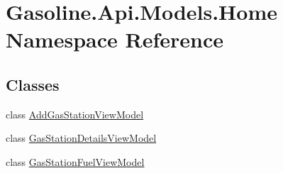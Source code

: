 \hypertarget{namespace_gasoline_1_1_api_1_1_models_1_1_home}{}\section{Gasoline.\+Api.\+Models.\+Home Namespace Reference}
\label{namespace_gasoline_1_1_api_1_1_models_1_1_home}
\subsection*{Classes}
\begin{DoxyCompactItemize}
\item 
class \mbox{\hyperlink{class_gasoline_1_1_api_1_1_models_1_1_home_1_1_add_gas_station_view_model}{Add\+Gas\+Station\+View\+Model}}
\item 
class \mbox{\hyperlink{class_gasoline_1_1_api_1_1_models_1_1_home_1_1_gas_station_details_view_model}{Gas\+Station\+Details\+View\+Model}}
\item 
class \mbox{\hyperlink{class_gasoline_1_1_api_1_1_models_1_1_home_1_1_gas_station_fuel_view_model}{Gas\+Station\+Fuel\+View\+Model}}
\end{DoxyCompactItemize}
